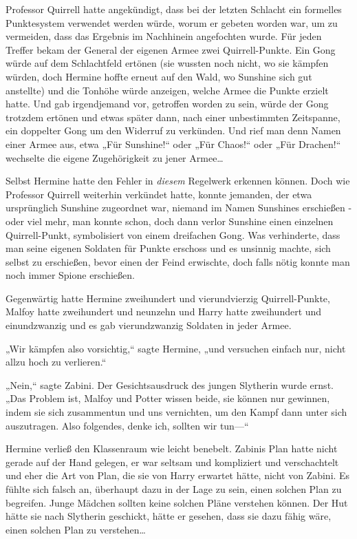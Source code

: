 {Professor Quirrell hatte angekündigt, dass bei der letzten Schlacht ein formelles Punktesystem verwendet werden würde, worum er gebeten worden war, um zu vermeiden, dass das Ergebnis im Nachhinein angefochten wurde. Für jeden Treffer bekam der General der eigenen Armee zwei Quirrell-Punkte. Ein Gong würde auf dem Schlachtfeld ertönen (sie wussten noch nicht, wo sie kämpfen würden, doch Hermine hoffte erneut auf den Wald, wo Sunshine sich gut anstellte) und die Tonhöhe würde anzeigen, welche Armee die Punkte erzielt hatte. Und gab irgendjemand vor, getroffen worden zu sein, würde der Gong trotzdem ertönen und etwas später dann, nach einer unbestimmten Zeitspanne, ein doppelter Gong um den Widerruf zu verkünden. Und rief man denn Namen einer Armee aus, etwa „Für Sunshine!“ oder „Für Chaos!“ oder „Für Drachen!“ wechselte die eigene Zugehörigkeit zu jener Armee…

Selbst Hermine hatte den Fehler in \emph{diesem} Regelwerk erkennen können. Doch wie Professor Quirrell weiterhin verkündet hatte, konnte jemanden, der etwa ursprünglich Sunshine zugeordnet war, niemand im Namen Sunshines erschießen - oder viel mehr, man konnte schon, doch dann verlor Sunshine einen einzelnen Quirrell-Punkt, symbolisiert von einem dreifachen Gong. Was verhinderte, dass man seine eigenen Soldaten für Punkte erschoss und es unsinnig machte, sich selbst zu erschießen, bevor einen der Feind erwischte, doch falls nötig konnte man noch immer Spione erschießen.

Gegenwärtig hatte Hermine zweihundert und vierundvierzig Quirrell-Punkte, Malfoy hatte zweihundert und neunzehn und Harry hatte zweihundert und einundzwanzig und es gab vierundzwanzig Soldaten in jeder Armee.

„Wir kämpfen also vorsichtig,“ sagte Hermine, „und versuchen einfach nur, nicht allzu hoch zu verlieren.“

„Nein,“ sagte Zabini. Der Gesichtsausdruck des jungen Slytherin wurde ernst. „Das Problem ist, Malfoy und Potter wissen beide, sie können nur gewinnen, indem sie sich zusammentun und uns vernichten, um den Kampf dann unter sich auszutragen. Also folgendes, denke ich, sollten wir tun—“

Hermine verließ den Klassenraum wie leicht benebelt. Zabinis Plan hatte nicht gerade auf der Hand gelegen, er war seltsam und kompliziert und verschachtelt und eher die Art von Plan, die sie von Harry erwartet hätte, nicht von Zabini. Es fühlte sich falsch an, überhaupt dazu in der Lage zu sein, einen solchen Plan zu begreifen. Junge Mädchen sollten keine solchen Pläne verstehen können. Der Hut hätte sie nach Slytherin geschickt, hätte er gesehen, dass sie dazu fähig wäre, einen solchen Plan zu verstehen…

}
